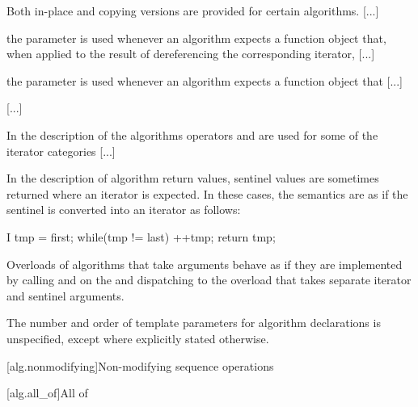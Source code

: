 \pnum
Both in-place and copying versions are provided for certain
algorithms. [...]

\pnum
{} the
parameter is used whenever an algorithm expects a function object
that, when applied to the result
of dereferencing the corresponding iterator, [...]

\pnum
{} the
parameter is used whenever an algorithm expects a function object that [...]

[...]

\setcounter{Paras}{10}
\pnum
In the description of the algorithms operators
\tcode{+}
and
\tcode{-}
are used for some of the iterator categories [...]

\begin{addedblock}
\pnum
In the description of algorithm return values, sentinel values are sometimes
returned where an iterator is expected. In these cases, the semantics are as
if the sentinel is converted into an iterator as follows:

\begin{codeblock}
I tmp = first;
while(tmp != last)
  ++tmp;
return tmp;
\end{codeblock}

\pnum
Overloads of algorithms that take  arguments
behave as if they are implemented by calling  and
 on the  and dispatching
to the overload that takes separate iterator and sentinel arguments.


\pnum
The number and order of template parameters for algorithm declarations
is unspecified, except where explicitly stated otherwise.
\end{addedblock}

\setcounter{section}{4}
[alg.nonmodifying]{Non-modifying sequence operations}

[alg.all_of]{All of}

